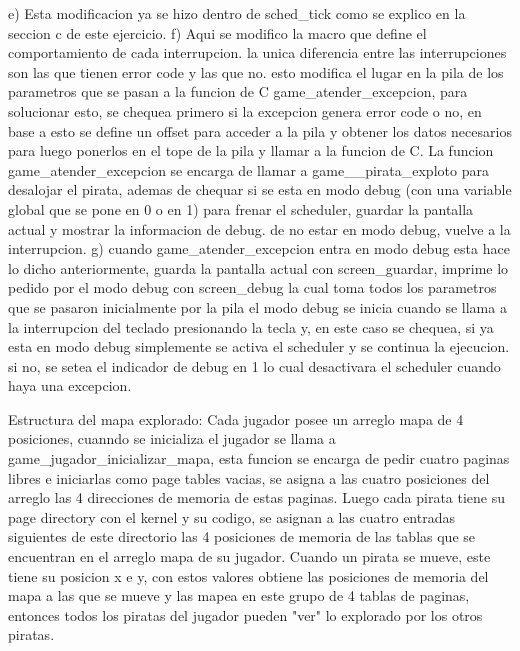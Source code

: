   e) Esta modificacion ya se hizo dentro de sched_tick como se explico en la seccion c de este ejercicio.
  f) Aqui se modifico la macro que define el comportamiento de cada interrupcion. la unica diferencia entre las interrupciones
    son las que tienen error code y las que no. esto modifica el lugar en la pila de los parametros que se pasan a la funcion de C
    game_atender_excepcion, para solucionar esto, se chequea primero si la excepcion genera error code o no, en base a esto se define un
    offset para acceder a la pila y obtener los datos necesarios para luego ponerlos en el tope de la pila y llamar a la funcion de C.
    La funcion game_atender_excepcion se encarga de llamar a game__pirata_exploto para desalojar el pirata, ademas de chequar
    si se esta en modo debug (con una variable global que se pone en 0 o en 1) para frenar el scheduler, guardar la pantalla actual y mostrar la informacion de debug. de no estar
    en modo debug, vuelve a la interrupcion.
  g) cuando game_atender_excepcion entra en modo debug esta hace lo dicho anteriormente, guarda la pantalla actual con screen_guardar,
    imprime lo pedido por el modo debug con screen_debug la cual toma todos los parametros que se pasaron inicialmente por la pila
    el modo debug se inicia cuando se llama a la interrupcion del teclado presionando la tecla y, en este caso se chequea, si ya esta en modo
    debug simplemente se activa el scheduler y se continua la ejecucion. si no, se setea el indicador de debug en 1 lo cual desactivara
    el scheduler cuando haya una excepcion.


Estructura del mapa explorado:
    Cada jugador posee un arreglo mapa de 4 posiciones, cuanndo se inicializa el jugador se llama a game_jugador_inicializar_mapa,
    esta funcion se encarga de pedir cuatro paginas libres e iniciarlas como page tables vacias, se asigna a las cuatro posiciones
    del arreglo las 4 direcciones de memoria de estas paginas.
    Luego cada pirata tiene su page directory con el kernel y su codigo, se asignan a las cuatro entradas siguientes de este directorio
    las 4 posiciones de memoria de las tablas que se encuentran en el arreglo mapa de su jugador.
    Cuando un pirata se mueve, este tiene su posicion x e y, con estos valores obtiene las posiciones de memoria del mapa a las que se mueve
    y las mapea en este grupo de 4 tablas de paginas, entonces todos los piratas del jugador pueden "ver" lo explorado por los
    otros piratas.

